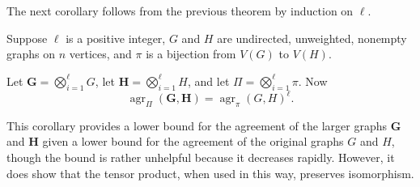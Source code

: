 \documentclass{article}
\newcommand{\1}{\mathbf{1}}
\DeclareMathOperator{\agr}{agr}
\begin{document}
The next corollary follows from the previous theorem by induction on $\ell$.

\begin{corollary}
  Suppose $\ell$ is a positive integer, $G$ and $H$ are undirected, unweighted, nonempty graphs on $n$ vertices, and $\pi$ is a bijection from $V(G)$ to $V(H)$.

  Let $\mathbf{G} = \bigotimes_{i = 1}^\ell G$, let $\mathbf{H} = \bigotimes_{i = 1}^\ell H$, and let $\Pi = \bigotimes_{i = 1}^\ell \pi$.
  Now
  \begin{equation*}
    \agr_{\Pi}(\mathbf{G}, \mathbf{H}) = \agr_\pi(G, H)^\ell.
  \end{equation*}
\end{corollary}

This corollary provides a lower bound for the agreement of the larger graphs $\mathbf{G}$ and $\mathbf{H}$ given a lower bound for the agreement of the original graphs $G$ and $H$, though the bound is rather unhelpful because it decreases rapidly.
However, it does show that the tensor product, when used in this way, preserves isomorphism.

\end{document}
